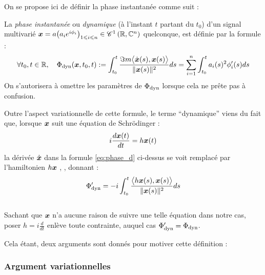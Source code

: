 On se propose ici de définir la phase instantanée comme suit :
\begin{definition} \label{def:phase_d}
	La \emph{phase instantanée} ou \emph{dynamique} (à l'instant $t$ partant du $t_0$) d'un signal multivarié $\x = a\big(a_ie^{i\phi_i}\big)_{1\leq i\leq n} \in \conti[1]{\R}{\C^n}$ quelconque, est définie par la formule :
	\begin{equation} \label{eq:phase_d}
		\forall t_0, t\in\R, \quad \phased(\x, t_0,t) \defeq \int_{t_0}^t \frac{\Im m \big\langle \dot{\x}(s) , \x(s) \big\rangle}{\|\x(s)\|^2} ds =\sum_{i=1}^n \int_{t_0}^t a_i(s)^2 \phi_i'(s)ds
	\end{equation}
	On s'autorisera à omettre les paramètres de $\phased$ lorsque cela ne prête pas à confusion.
\end{definition}

\begin{remarque}
	Outre l'aspect variationnelle de cette formule, le terme ``dynamique'' viens du fait que, lorsque $\x$ suit une équation de Schrödinger :
	\begin{equation}\label{eq:schrodinger}
		i\frac{d \x(t)}{dt} = h\x(t)
	\end{equation}
	la dérivée $\dot{\x}$ dans la formule \eqref{eq:phase_d} ci-dessus se voit remplacé par l'hamiltonien $h\x$ {\normalfont \cite[sec. 2]{bohm_geometric_2003}, \cite[p.~215]{mukunda_quantum_1993}}, donnant :
	\[\phased' = -i \int_{t_0}^t\frac{\big\langle h\x(s) , \x(s) \big\rangle}{\|\x(s)\|^2} ds\] 
	\\
	Sachant que $\x$ n'a aucune raison de suivre une telle équation dans notre cas, poser $h = i\frac{d}{dt}$ enlève toute contrainte, auquel cas $\phased'=\phased$.
\end{remarque}
\skipl

Cela étant, deux arguments sont donnés pour motiver cette définition :
\\

\subsubsection*{Argument variationnelles}

